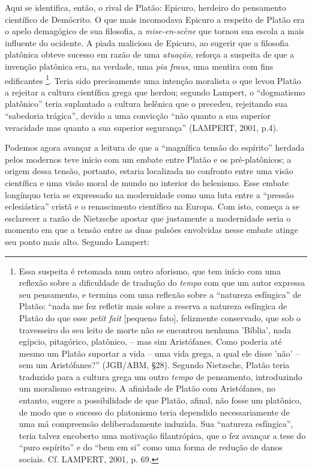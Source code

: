 \documentclass[
	12pt,				%
	openright,			%
	oneside,			%
	a4paper,			%
	english,			%
	french,				%
	spanish,			%
	brazil				%
	]{abntex2}
\begin{document}
Aqui se identifica, então, o rival de Platão: Epicuro, herdeiro do pensamento científico de Demócrito. O que mais incomodava Epicuro a respeito de Platão era o apelo demagógico de sua filosofia, a \textit{mise-en-scène} que tornou sua escola a mais influente do ocidente. A piada maliciosa de Epicuro, ao sugerir que a filosofia platônica obteve sucesso em razão de uma \textit{atuação}, reforça a suspeita de que a invenção platônica era, na verdade, uma \textit{pia fraus}, uma mentira com fins edificantes
\footnote{Essa suspeita é retomada num outro aforismo, que tem início com uma reflexão sobre a dificuldade de tradução do \textit{tempo} com que um autor expressa seu pensamento, e termina com uma reflexão sobre a “natureza esfíngica” de Platão: “nada me fez refletir mais sobre a reserva a natureza esfíngica de Platão do que esse \textit{petit fait} [pequeno fato], felizmente conservado, que sob o travesseiro do seu leito de morte não se encontrou nenhuma 'Bíblia', nada egípcio, pitagórico, platônico, – mas sim Aristófanes. Como poderia até mesmo um Platão suportar a vida – uma vida grega, a qual ele disse 'não' – sem um Aristófanes?” (JGB/ABM, §28). Segundo Nietzsche, Platão teria traduzido para a cultura grega um outro \textit{tempo} de pensamento, introduzindo um moralismo estrangeiro. A afinidade de Platão com Aristófanes, no entanto, sugere a possibilidade de que Platão, afinal, não fosse um platônico, de modo que o sucesso do platonismo teria dependido necessariamente de uma má compreensão deliberadamente induzida. Sua “natureza esfíngica”, teria talvez encoberto uma motivação filantrópica, que o fez avançar a tese do “puro espírito” e do “bem em si” como uma forma de redução de danos sociais. Cf. LAMPERT, 2001, p. 69.}. 
Teria sido precisamente uma intenção moralista o que levou Platão a rejeitar a cultura científica grega que herdou; segundo Lampert, o “dogmatismo platônico” teria suplantado a cultura helênica que o precedeu, rejeitando sua “sabedoria trágica”, devido a uma convicção “não quanto a sua superior veracidade mas quanto a sua superior segurança” (LAMPERT, 2001, p.4).

	Podemos agora avançar a leitura de que a “magnífica tensão do espírito” herdada pelos modernos teve início com um embate entre Platão e os pré-platônicos; a origem dessa tensão, portanto, estaria localizada no confronto entre uma visão científica e uma visão moral de mundo no interior do helenismo. Esse embate longínquo teria se expressado na modernidade como uma luta entre a “pressão eclesiástica” cristã e o renascimento científico na Europa. Com isto, começa a se esclarecer a razão de Nietzsche apostar que justamente a modernidade seria o momento em que a tensão entre as duas pulsões envolvidas nesse embate atinge seu ponto mais alto. Segundo Lampert:
\end{document}
